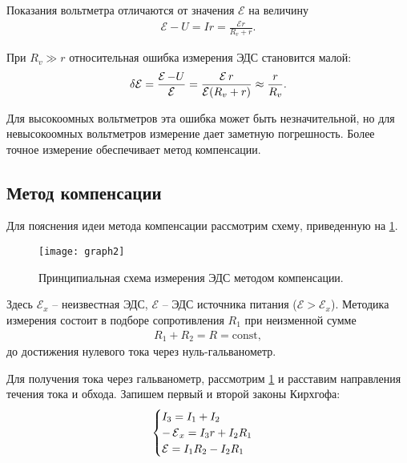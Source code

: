 Показания вольтметра отличаются от значения $\mathcal{E}$ на величину
\begin{align}
	\mathcal{E} - U = I r = \frac{\mathcal{E} r}{R_v + r}.
\end{align}



При $R_v \gg r$ относительная ошибка измерения ЭДС становится малой:
\begin{align} \label{eq:6}
	\delta\mathcal{E} = \frac{\operatorname{\mathcal{E}} - U}{\operatorname{\mathcal{E}}} = \frac{\operatorname{\mathcal{E}} r}{\operatorname{\mathcal{E}} (R_v + r)} \approx \frac{r}{R_v}.
\end{align}

Для высокоомных вольтметров эта ошибка может быть незначительной, но для невысокоомных вольтметров измерение дает заметную погрешность. Более точное измерение обеспечивает метод компенсации.

\subsection{Метод компенсации}
Для пояснения идеи метода компенсации рассмотрим схему, приведенную на \cref{fig:2}.

\begin{figure}[H]
	\centering
	\texttt{[image: graph2]}
	\caption{Принципиальная схема измерения ЭДС методом компенсации.}
	\label{fig:2}
\end{figure}

Здесь $\mathcal{E}_x$ -- неизвестная ЭДС, $\mathcal{E}$ -- ЭДС источника питания ($\mathcal{E} > \mathcal{E}_x$). Методика измерения состоит в подборе сопротивления $R_1$ при неизменной сумме
\begin{align} \label{eq:7}
	R_1 + R_2 = R = \text{const},
\end{align}
до достижения нулевого тока через нуль-гальванометр. 

Для получения тока через гальванометр, рассмотрим \cref{fig:2} и расставим направления течения тока и обхода. Запишем первый и второй законы Кирхгофа:
\begin{align} \label{eq:1.1}
	\begin{cases}
		I_3 = I_1 + I_2\\
		-\operatorname{\mathcal{E}}_x = I_3 r + I_2 R_1\\
		\operatorname{\mathcal{E}} = I_1 R_2 - I_2 R_1
	\end{cases}
\end{align}

